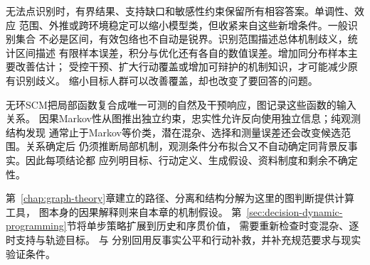 无法点识别时，有界结果、支持缺口和敏感性约束保留所有相容答案。单调性、效应
范围、外推或跨环境稳定可以缩小模型类，但收紧来自这些新增条件。一般识别集合
不必是区间，有效包络也不自动是锐界。识别范围描述总体机制歧义，统计区间描述
有限样本误差，积分与优化还有各自的数值误差。增加同分布样本主要改善估计；
受控干预、扩大行动覆盖或增加可辩护的机制知识，才可能减少原有识别歧义。
缩小目标人群可以改善覆盖，却也改变了要回答的问题。

无环SCM把局部函数复合成唯一可测的自然及干预响应，图记录这些函数的输入关系。
因果Markov性从图推出独立约束，忠实性允许反向使用独立信息；纯观测结构发现
通常止于Markov等价类，潜在混杂、选择和测量误差还会改变候选范围。关系确定后
仍须推断局部机制，观测条件分布拟合又不自动确定同背景反事实。因此每项结论都
应列明目标、行动定义、生成假设、资料制度和剩余不确定性。

第~\ref{chap:graph-theory}章建立的路径、分离和结构分解为这里的图判断提供计算工具，
图本身的因果解释则来自本章的机制假设。
第~\ref{sec:decision-dynamic-programming}节将单步策略扩展到历史和序贯价值，
需要重新检查时变混杂、逐时支持与轨迹目标。
与
分别回用反事实公平和行动补救，并补充规范要求与现实验证条件。
